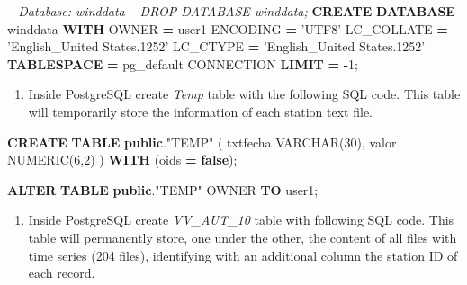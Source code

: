 \documentclass[12pt,twoside]{reedthesis}
\newenvironment{Shaded}{\begin{snugshade}}{\end{snugshade}}
\newcommand{\CommentTok}[1]{\textcolor[rgb]{0.56,0.35,0.01}{\textit{#1}}}
\newcommand{\DataTypeTok}[1]{\textcolor[rgb]{0.13,0.29,0.53}{#1}}
\newcommand{\DecValTok}[1]{\textcolor[rgb]{0.00,0.00,0.81}{#1}}
\newcommand{\KeywordTok}[1]{\textcolor[rgb]{0.13,0.29,0.53}{\textbf{#1}}}
\newcommand{\NormalTok}[1]{#1}
\newcommand{\OperatorTok}[1]{\textcolor[rgb]{0.81,0.36,0.00}{\textbf{#1}}}
\newcommand{\OtherTok}[1]{\textcolor[rgb]{0.56,0.35,0.01}{#1}}
\newcommand{\StringTok}[1]{\textcolor[rgb]{0.31,0.60,0.02}{#1}}
\providecommand{\tightlist}{%
  \setlength{\itemsep}{0pt}\setlength{\parskip}{0pt}}
\begin{document}
\scriptsize

\vspace{0.4cm}
\begin{Shaded}
\begin{Highlighting}[]
        \CommentTok{-- Database: winddata}
        \CommentTok{-- DROP DATABASE winddata;}
        \KeywordTok{CREATE} \KeywordTok{DATABASE}\NormalTok{ winddata}
            \KeywordTok{WITH} 
\NormalTok{            OWNER }\OperatorTok{=}\NormalTok{ user1}
\NormalTok{            ENCODING }\OperatorTok{=} \StringTok{'UTF8'}
\NormalTok{            LC_COLLATE }\OperatorTok{=} \StringTok{'English_United States.1252'}
\NormalTok{            LC_CTYPE }\OperatorTok{=} \StringTok{'English_United States.1252'}
            \KeywordTok{TABLESPACE} \OperatorTok{=}\NormalTok{ pg_default}
\NormalTok{            CONNECTION }\KeywordTok{LIMIT} \OperatorTok{=} \OperatorTok{-}\DecValTok{1}\NormalTok{;}
\end{Highlighting}
\end{Shaded}
\normalsize
\begin{enumerate}
\def\labelenumi{\arabic{enumi}.}
\setcounter{enumi}{2}
\tightlist
\item
  Inside PostgreSQL create \emph{Temp} table with the following SQL code. This table will temporarily store the information of each station text file.
\end{enumerate}
\scriptsize

\vspace{0.4cm}
\begin{Shaded}
\begin{Highlighting}[]
        \KeywordTok{CREATE} \KeywordTok{TABLE} \KeywordTok{public}\NormalTok{.}\OtherTok{"TEMP"}\NormalTok{ (}
\NormalTok{          txtfecha }\DataTypeTok{VARCHAR}\NormalTok{(}\DecValTok{30}\NormalTok{),}
\NormalTok{          valor }\DataTypeTok{NUMERIC}\NormalTok{(}\DecValTok{6}\NormalTok{,}\DecValTok{2}\NormalTok{) ) }\KeywordTok{WITH}\NormalTok{ (oids }\OperatorTok{=} \KeywordTok{false}\NormalTok{);}
        
        \KeywordTok{ALTER} \KeywordTok{TABLE} \KeywordTok{public}\NormalTok{.}\OtherTok{"TEMP"}
\NormalTok{          OWNER }\KeywordTok{TO}\NormalTok{ user1;}
\end{Highlighting}
\end{Shaded}
\normalsize
\begin{enumerate}
\def\labelenumi{\arabic{enumi}.}
\setcounter{enumi}{3}
\tightlist
\item
  Inside PostgreSQL create \emph{VV\_AUT\_10} table with following SQL code. This table will permanently store, one under the other, the content of all files with time series (204 files), identifying with an additional column the station ID of each record.
\end{enumerate}
\scriptsize
\end{document}
